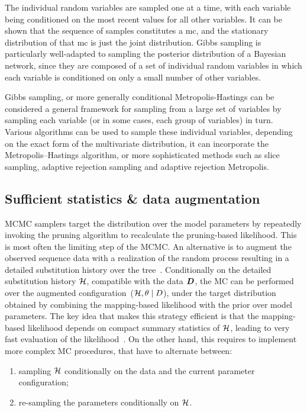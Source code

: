 The individual random variables are sampled one at a time, with each variable being conditioned on the most recent values for all other variables.
It can be shown that the sequence of samples constitutes a \gls{mc}, and the stationary distribution of that \gls{mc} is just the joint distribution.
Gibbs sampling is particularly well-adapted to sampling the \gls{posterior} distribution of a Bayesian network, since they are composed of a set of individual random variables in which each variable is conditioned on only a small number of other variables.

Gibbs sampling, or more generally conditional Metropolis-Hastings can be considered a general framework for sampling from a large set of variables by sampling each variable (or in some cases, each group of variables) in turn.
Various algorithms can be used to sample these individual variables, depending on the exact form of the multivariate distribution, it can incorporate the Metropolis–Hastings algorithm, or more sophisticated methods such as slice sampling, adaptive rejection sampling and adaptive rejection Metropolis.

\subsection{Sufficient statistics \& data augmentation}
\label{subsec:suffstats-data-augmentation}

MCMC samplers target the distribution over the model parameters by repeatedly invoking the pruning algorithm to recalculate the pruning-based \gls{likelihood}.
This is most often the limiting step of the MCMC.
An alternative is to augment the observed sequence data with a realization of the random process resulting in a detailed \gls{substitution} history over the tree~\citep{Nielsen2002,Rodrigue2008}.
Conditionally on the detailed \gls{substitution} history $\mathcal{H}$, compatible with the data $\bm{D}$, the \acrshort{MC} can be performed over the augmented configuration~($\mathcal{H}, \theta \mid D$), under the target distribution obtained by combining the mapping-based \gls{likelihood} with the \gls{prior} over model parameters.
The key idea that makes this strategy efficient is that the mapping-based \gls{likelihood} depends on compact summary statistics of $\mathcal{H}$, leading to very fast evaluation of the \gls{likelihood}~\citep{Lartillot2006,DeKoning2010,Romiguier2012,Irvahn2014,Davydov2016,Gueguen2018}.
On the other hand, this requires to implement more complex \acrshort{MC} procedures, that have to alternate between:
\begin{enumerate}
    \item sampling $\mathcal{H}$ conditionally on the data and the current parameter configuration;
    \item re-sampling the parameters conditionally on $\mathcal{H}$.
\end{enumerate}

